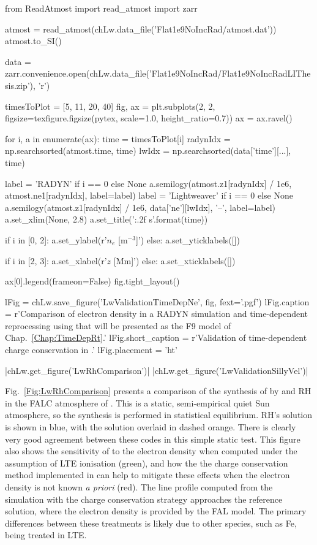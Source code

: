 \begin{pycode}[Lw]
from ReadAtmost import read_atmost
import zarr

atmost = read_atmost(chLw.data_file('Flat1e9NoIncRad/atmost.dat'))
atmost.to_SI()

data = zarr.convenience.open(chLw.data_file('Flat1e9NoIncRad/Flat1e9NoIncRadLIThesis.zip'), 'r')

timesToPlot = [5, 11, 20, 40]
fig, ax = plt.subplots(2, 2, figsize=texfigure.figsize(pytex, scale=1.0, height_ratio=0.7))
ax = ax.ravel()

for i, a in enumerate(ax):
    time = timesToPlot[i]
    radynIdx = np.searchsorted(atmost.time, time)
    lwIdx = np.searchsorted(data['time'][...], time)

    label = 'RADYN' if i == 0 else None
    a.semilogy(atmost.z1[radynIdx] / 1e6, atmost.ne1[radynIdx], label=label)
    label = 'Lightweaver' if i == 0 else None
    a.semilogy(atmost.z1[radynIdx] / 1e6, data['ne'][lwIdx], '--', label=label)
    a.set_xlim(None, 2.8)
    a.set_title('{:.2f} s'.format(time))

    if i in [0, 2]:
        a.set_ylabel(r'$n_e$ [m$^{-3}$]')
    else:
        a.set_yticklabels([])

    if i in [2, 3]:
        a.set_xlabel(r'$z$ [Mm]')
    else:
        a.set_xticklabels([])

ax[0].legend(frameon=False)
fig.tight_layout()

lFig = chLw.save_figure('LwValidationTimeDepNe', fig, fext='.pgf')
lFig.caption = r'Comparison of electron density in a RADYN simulation and time-dependent reprocessing using \Lw{} that will be presented as the F9 model of Chap.~\ref{Chap:TimeDepRt}.'
lFig.short_caption = r'Validation of time-dependent charge conservation in \Lw{}.'
lFig.placement = 'ht'
\end{pycode}

\py[Lw]|chLw.get_figure('LwRhComparison')|
\py[Lw]|chLw.get_figure('LwValidationSillyVel')|


Fig.~\ref{Fig:LwRhComparison} presents a comparison of the synthesis of \CaLine{} by \Lw{} and RH in the FALC atmosphere of \citet{Fontenla1993}.
This is a static, semi-empirical quiet Sun atmosphere, so the synthesis is performed in statistical equilibrium.
RH's solution is shown in blue, with the \Lw{} solution overlaid in dashed orange.
There is clearly very good agreement between these codes in this simple static test.
This figure also shows the sensitivity of \CaLine{} to the electron density when computed under the assumption of LTE ionisation (green), and how the the charge conservation method implemented in \Lw{} can help to mitigate these effects when the electron density is not known \emph{a priori} (red).
The line profile computed from the simulation with the charge conservation strategy approaches the reference solution, where the electron density is provided by the FAL model.
The primary differences between these treatments is likely due to other species, such as Fe, being treated in LTE.

